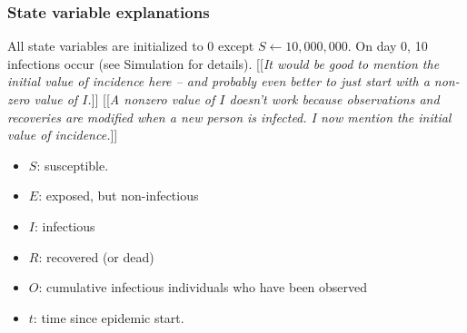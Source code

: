 \documentclass{article}
\newcommand{\jd}[1]{[[\textsl{#1}]]} %
\newcommand{\msComment}[1]{[[\textsl{#1}]]}
\begin{document}
\subsubsection{State variable explanations}
All state variables are initialized to 0 except $S \gets 10,000,000$. On day 0, 10 infections occur (see Simulation for details). 
\jd{It would be good to mention the initial value of incidence here -- and probably even better to just start with a non-zero value of $I$.} \msComment{A nonzero value of $I$ doesn't work because observations and recoveries are modified when a new person is infected. I now mention the initial value of incidence.}

\begin{itemize}
    \item $S$: susceptible.
    \item $E$: exposed, but non-infectious
    \item $I$: infectious
    \item $R$: recovered (or dead)
    \item $O$: cumulative infectious individuals who have been observed 
    \item $t$: time since epidemic start.
\end{itemize}
\end{document}
